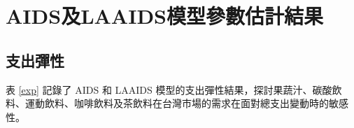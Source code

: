
\section{AIDS及LAAIDS模型參數估計結果}






\subsection{支出彈性}

表 \ref{exp} 記錄了 AIDS 和 LAAIDS 模型的支出彈性結果，探討果蔬汁、碳酸飲料、運動飲料、咖啡飲料及茶飲料在台灣市場的需求在面對總支出變動時的敏感性。

